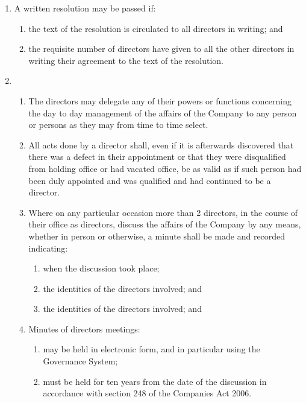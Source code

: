 \begin{enumerate}
\item
    A written resolution may be passed if:
    \begin{enumerate}
        \item
        the text of the resolution is circulated to all directors in writing; and
        \item
        the requisite number of directors have given to all the other directors in writing their
        agreement to the text of the resolution.
    \end{enumerate}

\item
    \begin{enumerate}
    \item
        The directors may delegate any of their powers or functions concerning the day
        to day management of the affairs of the Company to any person or persons as they may
        from time to time select.
    \item
        All acts done by a director shall, even if it is afterwards discovered that there was
        a defect in their appointment or that they were disqualified from holding office or had
        vacated office, be as valid as if such person had been duly appointed and was qualified
        and had continued to be a director.
    \item
        Where on any particular occasion more than 2 directors, in the course of their
        office as directors, discuss the affairs of the Company by any means, whether in person
        or otherwise, a minute shall be made and recorded indicating:
            \begin{enumerate}
                \item
                    when the discussion took place;
                \item
                    the identities of the directors involved; and
                \item
                    the identities of the directors involved; and
            \end{enumerate}
    \item
        Minutes of directors meetings:
            \begin{enumerate}
                \item
                    may be held in electronic form, and in particular using the Governance System;
                \item
                    must be held for ten years from the date of the discussion in accordance with section
                    248 of the Companies Act 2006.
            \end{enumerate}
    \end{enumerate}


\end{enumerate}
